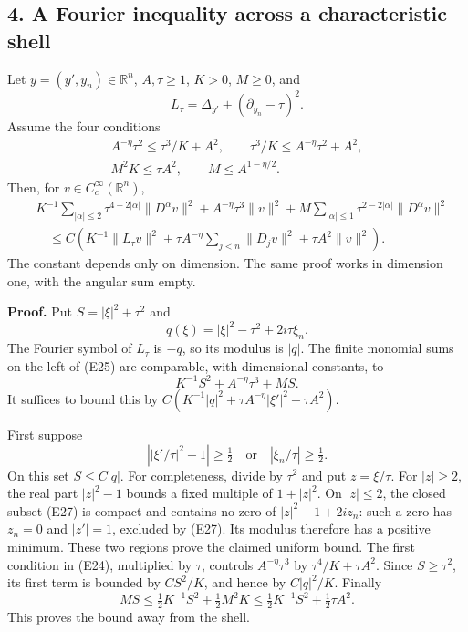 \documentclass[
  11pt,
]{article}
\begin{document}
\subsection{4. A Fourier inequality across a characteristic
shell}\label{a-fourier-inequality-across-a-characteristic-shell}

Let \(y=(y',y_n)\in\mathbb R^n\), \(A,\tau\geq1\), \(K>0\), \(M\geq0\),
and \[
 L_\tau=\Delta_{y'}+(\partial_{y_n}-\tau)^2.
\] Assume the four conditions \[
\begin{gathered}
 A^{-\eta}\tau^2\leq\tau^3/K+A^2,
 \qquad \tau^3/K\leq A^{-\eta}\tau^2+A^2,\\
 M^2K\leq\tau A^2,
 \qquad M\leq A^{1-\eta/2}.
\end{gathered}                                                    \tag{E24}
\] Then, for \(v\in C_c^\infty(\mathbb R^n)\), \[
\begin{split}
 &K^{-1}\sum_{|\alpha|\leq2}\tau^{4-2|\alpha|}\|D^\alpha v\|^2
    +A^{-\eta}\tau^3\|v\|^2
    +M\sum_{|\alpha|\leq1}\tau^{2-2|\alpha|}\|D^\alpha v\|^2\\
 &\quad\leq C\left(K^{-1}\|L_\tau v\|^2
       +\tau A^{-\eta}\sum_{j<n}\|D_jv\|^2
       +\tau A^2\|v\|^2\right).
\end{split}                                                       \tag{E25}
\] The constant depends only on dimension. The same proof works in
dimension one, with the angular sum empty.

\textbf{Proof.} Put \(S=|\xi|^2+\tau^2\) and \[
 q(\xi)=|\xi|^2-\tau^2+2i\tau\xi_n.
\] The Fourier symbol of \(L_\tau\) is \(-q\), so its modulus is
\(|q|\). The finite monomial sums on the left of (E25) are comparable,
with dimensional constants, to \[
             K^{-1}S^2+A^{-\eta}\tau^3+MS.                       \tag{E26}
\] It suffices to bound this by
\(C(K^{-1}|q|^2+\tau A^{-\eta}|\xi'|^2+\tau A^2)\).

First suppose \[
 \left||\xi'/\tau|^2-1\right|\geq\tfrac12
 \quad\text{or}\quad |\xi_n/\tau|\geq\tfrac12.                  \tag{E27}
\] On this set \(S\leq C|q|\). For completeness, divide by \(\tau^2\)
and put \(z=\xi/\tau\). For \(|z|\geq2\), the real part \(|z|^2-1\)
bounds a fixed multiple of \(1+|z|^2\). On \(|z|\leq2\), the closed
subset (E27) is compact and contains no zero of \(|z|^2-1+2iz_n\): such
a zero has \(z_n=0\) and \(|z'|=1\), excluded by (E27). Its modulus
therefore has a positive minimum. These two regions prove the claimed
uniform bound. The first condition in (E24), multiplied by \(\tau\),
controls \(A^{-\eta}\tau^3\) by \(\tau^4/K+\tau A^2\). Since
\(S\geq\tau^2\), its first term is bounded by \(CS^2/K\), and hence by
\(C|q|^2/K\). Finally \[
 MS\leq\tfrac12K^{-1}S^2+\tfrac12M^2K
          \leq\tfrac12K^{-1}S^2+\tfrac12\tau A^2.                \tag{E28}
\] This proves the bound away from the shell.
\end{document}
